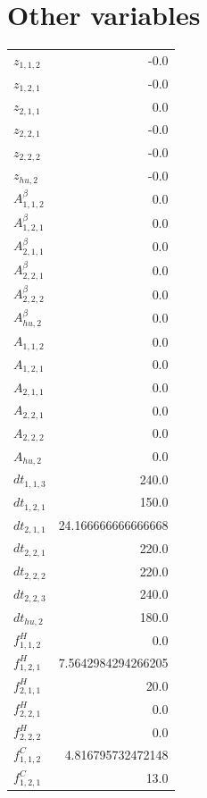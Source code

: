 \documentclass{article}%
\makeatletter
\let\mcnewpage=\newpage%
\newcommand{\TrickSupertabularIntoMulticols}{%
\renewcommand\newpage{%
\if@firstcolumn%
\hrule width\linewidth height0pt%
\columnbreak%
\else%
\mcnewpage%
\fi%
}%
}%
\makeatother
\begin{document}
\section{Other variables}%
\thispagestyle{plain}%
\begin{multicols*}{3}%
\TrickSupertabularIntoMulticols%
%
\begin{supertabular}{lr}%
	$z_{1,1,2}$ & -0.0 \\%
	$z_{1,2,1}$ & -0.0 \\%
	$z_{2,1,1}$ & 0.0 \\%
	$z_{2,2,1}$ & -0.0 \\%
	$z_{2,2,2}$ & -0.0 \\%
	$z_{hu,2}$ & -0.0 \\%
	$A_{1,1,2}^{\beta}$ & 0.0 \\%
	$A_{1,2,1}^{\beta}$ & 0.0 \\%
	$A_{2,1,1}^{\beta}$ & 0.0 \\%
	$A_{2,2,1}^{\beta}$ & 0.0 \\%
	$A_{2,2,2}^{\beta}$ & 0.0 \\%
	$A_{hu,2}^{\beta}$ & 0.0 \\%
	$A_{1,1,2}$ & 0.0 \\%
	$A_{1,2,1}$ & 0.0 \\%
	$A_{2,1,1}$ & 0.0 \\%
	$A_{2,2,1}$ & 0.0 \\%
	$A_{2,2,2}$ & 0.0 \\%
	$A_{hu,2}$ & 0.0 \\%
	$dt_{1,1,3}$ & 240.0 \\%
	$dt_{1,2,1}$ & 150.0 \\%
	$dt_{2,1,1}$ & 24.166666666666668 \\%
	$dt_{2,2,1}$ & 220.0 \\%
	$dt_{2,2,2}$ & 220.0 \\%
	$dt_{2,2,3}$ & 240.0 \\%
	$dt_{hu,2}$ & 180.0 \\%
	$f_{1,1,2}^{H}$ & 0.0 \\%
	$f_{1,2,1}^{H}$ & 7.5642984294266205 \\%
	$f_{2,1,1}^{H}$ & 20.0 \\%
	$f_{2,2,1}^{H}$ & 0.0 \\%
	$f_{2,2,2}^{H}$ & 0.0 \\%
	$f_{1,1,2}^{C}$ & 4.816795732472148 \\%
	$f_{1,2,1}^{C}$ & 13.0 \\%

\end{supertabular}
\end{multicols*}
\end{document}
